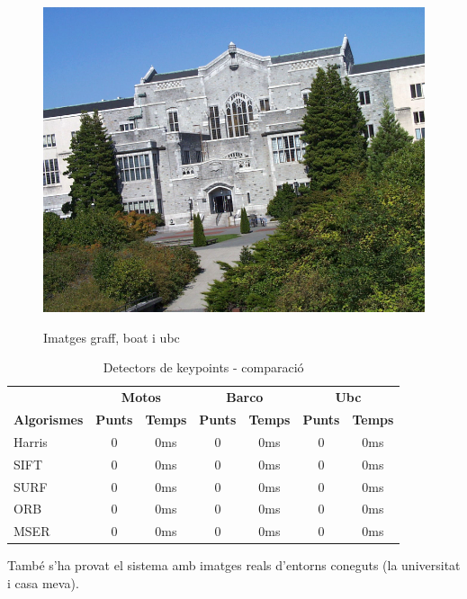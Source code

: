 \begin{figure}[!htb]
				\label{fig:awesome_image2}
			\endminipage\hfill
				\includegraphics[width=\linewidth]{images/experiments/ubc}
				\label{fig:awesome_image3}
			\endminipage
			\caption{Imatges graff, boat i ubc}
		\end{figure}

		\begin{table}[H]
			\begin{center}
				\begin{tabular}{l | c c | c c | c c}
					& \multicolumn{2}{c|}{\textbf{Motos}} & \multicolumn{2}{c|}{\textbf{Barco}} & \multicolumn{2}{c}{\textbf{Ubc}} \\
					\textbf{Algorismes} & \textbf{Punts} & \textbf{Temps} & \textbf{Punts} & \textbf{Temps} & \textbf{Punts} & \textbf{Temps} \\ \hline
					Harris & 0 & 0ms & 0 & 0ms & 0 & 0ms \\
					SIFT & 0 & 0ms & 0 & 0ms & 0 & 0ms \\
					SURF & 0 & 0ms & 0 & 0ms & 0 & 0ms \\
					ORB & 0 & 0ms & 0 & 0ms & 0 & 0ms \\
					MSER & 0 & 0ms & 0 & 0ms & 0 & 0ms \\
				\end{tabular}
			\end{center}
			\caption{Detectors de keypoints - comparació}
		\end{table}
		\noindent
		També s'ha provat el sistema amb imatges reals d'entorns coneguts (la universitat i casa meva).

